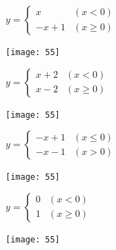 \documentclass[a4paper]{oblivoir}
\begin{document}
\clearpage
\begin{minipage}{0.45\textwidth}\centering
\(y=\begin{cases}x&(x<0)\\-x+1&(x\ge0)\end{cases}\)
\par\bigskip\texttt{[image: 55]}
\end{minipage}
\begin{minipage}{0.45\textwidth}\centering
\(y=\begin{cases}x+2&(x<0)\\x-2&(x\ge0)\end{cases}\)
\par\bigskip\texttt{[image: 55]}
\end{minipage}\bigskip\bigskip\par
\begin{minipage}{0.45\textwidth}\centering
\(y=\begin{cases}-x+1&(x\le0)\\-x-1&(x>0)\end{cases}\)
\par\bigskip\texttt{[image: 55]}
\end{minipage}
\begin{minipage}{0.45\textwidth}\centering
\(y=\begin{cases}0&(x<0)\\1&(x\ge0)\end{cases}\)
\par\bigskip\texttt{[image: 55]}
\end{minipage}\bigskip\bigskip\par
\end{document}
